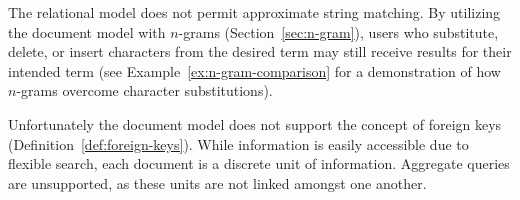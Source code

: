 		The relational model does not permit approximate string matching.  By utilizing the document model with $n$-grams (Section~\ref{sec:n-gram}), users who substitute, delete, or insert characters from the desired term may still receive results for their intended term (see Example~\ref{ex:n-gram-comparison} for a demonstration of how $n$-grams overcome character substitutions).
		
		Unfortunately the document model does not support the concept of foreign keys (Definition~\ref{def:foreign-keys}).  While information is easily accessible due to flexible search, each document is a discrete unit of information.  Aggregate queries are unsupported, as these units are not linked amongst one another.